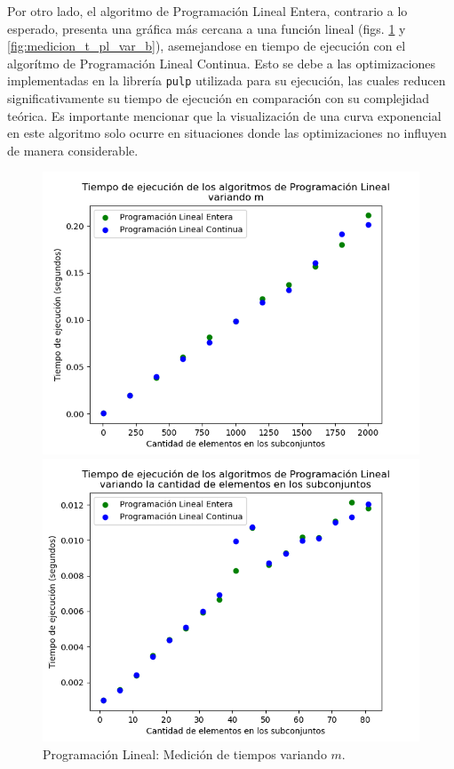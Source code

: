 Por otro lado, el algoritmo de Programación Lineal Entera, contrario a lo esperado, presenta una gráfica más cercana a una función lineal (figs. \ref{fig:medicion_t_pl_var_m} y \ref{fig:medicion_t_pl_var_b}), asemejandose en tiempo de ejecución con el algorítmo de Programación Lineal Continua. Esto se debe a las optimizaciones implementadas en la librería \texttt{pulp} utilizada para su ejecución, las cuales reducen significativamente su tiempo de ejecución en comparación con su complejidad teórica. Es importante mencionar que la visualización de una curva exponencial en este algoritmo solo ocurre en situaciones donde las optimizaciones no influyen de manera considerable.

\begin{figure}[h]
    \centering
    \begin{minipage}{0.45\textwidth}
        \centering
        \includegraphics[width=\textwidth]{img/medicion_t_pl_var_m.png}
        \caption{Programación Lineal: Medición de tiempos variando $m$.}
        \label{fig:medicion_t_pl_var_m}
    \end{minipage}\hfill
    \begin{minipage}{0.45\textwidth}
        \centering
        \includegraphics[width=\textwidth]{img/medicion_t_pl_var_b.png}

\end{minipage}
\end{figure}
